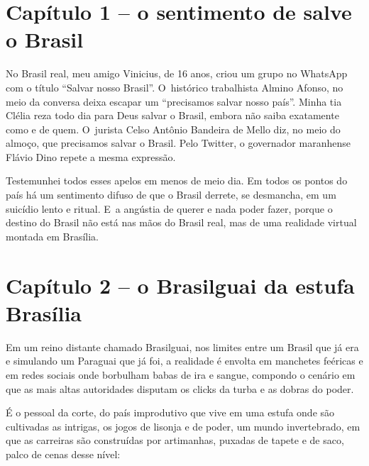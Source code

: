  

\section{Capítulo 1 -- o sentimento de salve o Brasil}

No Brasil real, meu amigo Vinicius, de 16 anos, criou um grupo no
WhatsApp com o título ``Salvar nosso Brasil''. O~histórico trabalhista
Almino Afonso, no meio da conversa deixa escapar um ``precisamos salvar
nosso país''. Minha tia Clélia reza todo dia para Deus salvar o Brasil,
embora não saiba exatamente como e de quem. O~jurista Celso Antônio
Bandeira de Mello diz, no meio do almoço, que precisamos salvar o
Brasil. Pelo Twitter, o governador maranhense Flávio Dino repete a mesma
expressão.

Testemunhei todos esses apelos em menos de meio dia. Em todos os pontos
do país há um sentimento difuso de que o Brasil derrete, se desmancha,
em um suicídio lento e ritual. E~a angústia de querer e nada poder
fazer, porque o destino do Brasil não está nas mãos do Brasil real, mas
de uma realidade virtual montada em Brasília.

\section{Capítulo 2 -- o Brasilguai da estufa Brasília}

Em um reino distante chamado Brasilguai, nos limites entre um Brasil que
já era e simulando um Paraguai que já foi, a realidade é envolta em
manchetes feéricas e em redes sociais onde borbulham babas de ira e
sangue, compondo o cenário em que as mais altas autoridades disputam os
clicks da turba e as dobras do poder.

É o pessoal da corte, do país improdutivo que vive em uma estufa onde
são cultivadas as intrigas, os jogos de lisonja e de poder, um mundo
invertebrado, em que as carreiras são construídas por artimanhas,
puxadas de tapete e de saco, palco de cenas desse nível:


